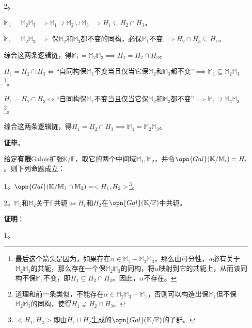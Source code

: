 2。

$\mathbb{M}_1=\mathbb{M}_2\mathbb{M}_3\implies \mathbb{M}_1\supseteq\mathbb{M}_2\cup\mathbb{M}_3\implies H_1\subseteq H_2\cap H_3$。

$\mathbb{M}_1=\mathbb{M}_2\mathbb{M}_3\implies$ 保$\mathbb{M}_2$和$\mathbb{M}_3$都不变的同构，必保$\mathbb{M}_1$不变$\implies H_2\cap H_3\subseteq H_1$。

综合这两条逻辑链，得$\mathbb{M}_1=\mathbb{M}_2\mathbb{M}_3 \implies H_1=H_2\cap H_3$。

$H_1=H_2\cap H_3\iff$“自同构保$\mathbb{M}_1$不变当且仅当它保$\mathbb{M}_2$和$\mathbb{M}_3$都不变”$\implies \mathbb{M}_1\subseteq\mathbb{M}_2\mathbb{M}_3$\footnote{最后这个箭头是因为，如果存在$\alpha\in\mathbb{M}_1-\mathbb{M}_2\mathbb{M}_3$，那么由可分性，$\alpha$必有关于$\mathbb{M}_2\mathbb{M}_3$的共轭，那么存在一个保$\mathbb{M}_2\mathbb{M}_3$的同构，将$\alpha$映射到它的共轭上，从而该同构不保$\mathbb{M}_1$不变，即$H_1\subsetneq H_2\cap H_3$。因此，$\alpha$不存在。}。

$H_1=H_2\cap H_3\iff$“自同构保$\mathbb{M}_1$不变当且仅当它保$\mathbb{M}_2$和$\mathbb{M}_3$都不变”$\implies \mathbb{M}_1\supseteq\mathbb{M}_2\mathbb{M}_3$\footnote{道理和前一条类似，不能存在$\alpha\in\mathbb{M}_2\mathbb{M}_3-\mathbb{M}_1$，否则可以构造出保$\mathbb{M}_1$但不保$\mathbb{M}_2\mathbb{M}_3$的同构，使得$H_1\supsetneq H_2\cap H_3$。}。

综合这两条逻辑链，得$H_1=H_2\cap H_3 \implies \mathbb{M}_1=\mathbb{M}_2\mathbb{M}_3$。


\textbf{证毕}。









\begin{theorem}{}
给定\textbf{有限}Galois扩张$\mathbb{K}/\mathbb{F}$，取它的两个中间域$\mathbb{M}_1, \mathbb{M}_2$，并令$\opn{Gal}(\mathbb{K}/\mathbb{M}_i)=H_i$。则下列命题成立：

1。$\opn{Gal}(\mathbb{K}/\mathbb{M}_1\cap\mathbb{M}_2)=<H_1, H_2>$\footnote{$<H_1, H_2>$即由$H_1\cup H_2$生成的$\opn{Gal}(\mathbb{K}/\mathbb{F})$的子群。}。

2。$\mathbb{M}_1$和$\mathbb{M}_2$关于$\mathbb{F}$共轭$\iff H_1$和$H_2$在$\opn{Gal}(\mathbb{K}/\mathbb{F})$中共轭。

\end{theorem}

\textbf{证明}：

1。

